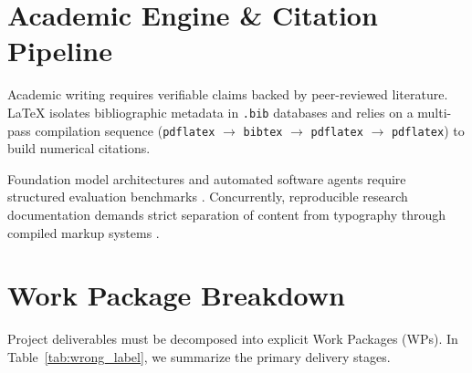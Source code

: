 \section{Academic Engine \& Citation Pipeline}

Academic writing requires verifiable claims backed by peer-reviewed literature. LaTeX isolates bibliographic metadata in \texttt{.bib} databases and relies on a multi-pass compilation sequence (\texttt{pdflatex} $\rightarrow$ \texttt{bibtex} $\rightarrow$ \texttt{pdflatex} $\rightarrow$ \texttt{pdflatex}) to build numerical citations.

Foundation model architectures and automated software agents require structured evaluation benchmarks \cite{huyen2099_wrong_key}. Concurrently, reproducible research documentation demands strict separation of content from typography through compiled markup systems \cite{TODO_ADD_SECOND_KEY}.

\section{Work Package Breakdown}

Project deliverables must be decomposed into explicit Work Packages (WPs). In Table~\ref{tab:wrong_label}, we summarize the primary delivery stages.

